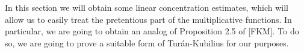 \documentclass[11pt]{amsart}
\theoremstyle{definition}
\newcommand{\Z}{{\mathbb Z}}
\begin{document}








\iffalse
In this section we will obtain some linear concentration estimates, which will allow us to easily treat the pretentious part of the multiplicative functions. In particular, we are going to obtain an analog of Proposition 2.5 of [FKM]. To do so, we are going to prove a suitable form of Tur\'an-Kubilius for our purposes. 
\end{document}
